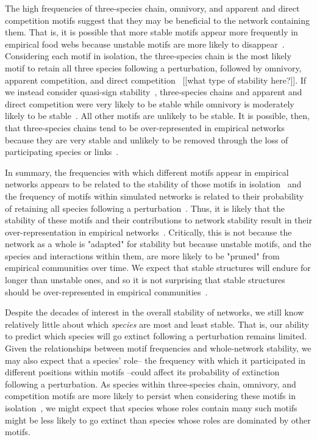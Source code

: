 \documentclass[12pt]{article}
\begin{document}
	The high frequencies of three-species chain, omnivory, and apparent and direct competition motifs suggest that they may be beneficial to the network containing them. That is, it is possible that more stable motifs appear more frequently in empirical food webs because unstable motifs are more likely to disappear~\citep{Borrelli2015,Borrelli2015a}. Considering each motif in isolation, the three-species chain is the most likely motif to retain all three species following a perturbation, followed by omnivory, apparent competition, and direct competition~\citep{Stouffer2010b} [[what type of stability here?]]. If we instead consider quasi-sign stability~\citep{Allesina2008}, three-species chains and apparent and direct competition were very likely to be stable while omnivory is moderately likely to be stable~\citep{Borrelli2015a}. All other motifs are unlikely to be stable. It is possible, then, that three-species chains tend to be over-represented in empirical networks because they are very stable and unlikely to be removed through the loss of participating species or links~\citep{Borrelli2015}. 

	In summary, the frequencies with which different motifs appear in empirical networks appears to be related to the stability of those motifs in isolation~\citep{Stouffer2010b,Borrelli2015a} and the frequency of motifs within simulated networks is related to their probability of retaining all species following a perturbation~\citep{Stouffer2010b}. Thus, it is likely that the stability of these motifs and their contributions to network stability result in their over-representation in empirical networks~\citep{Borrelli2015}. Critically, this is not because the network as a whole is "adapted" for stability but because unstable motifs, and the species and interactions within them, are more likely to be "pruned" from empirical communities over time. We expect that stable structures will endure for longer than unstable ones, and so it is not surprising that stable structures should be over-represented in empirical communities~\citep{Borrelli2015}.

	Despite the decades of interest in the overall stability of networks, we still know relatively little about which \emph{species} are most and least stable. That is, our ability to predict which species will go extinct following a perturbation remains limited. Given the relationships between motif frequencies and whole-network stability, we may also expect that a species' role-- the frequency with which it participated in different positions within motifs --could affect its probability of extinction following a perturbation. As species within three-species chain, omnivory, and competition motifs are more likely to persist when considering these motifs in isolation~\citep{Stouffer2010b}, we might expect that species whose roles contain many such motifs might be less likely to go extinct than species whose roles are dominated by other motifs. 
\end{document}
